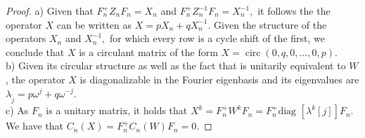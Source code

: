 \documentclass[10pt,a4paper]{amsart}
\newcommand{\circM}{\operatorname{circ}}
\begin{document}
\begin{proof}
    a) Given that $F_n^+Z_nF_n=X_n$ and $F_n^+Z_n^{-1}F_n=X_n^{-1},$ it follows the the operator $X $ can be written as $X=pX_n+qX_n^{-1}$. Given the structure of the operators $X_n$ and $X_n^{-1},$ for which every row is a cycle shift of the first, we conclude that $X$ is a circulant matrix of the 
   form  $X=\circM(0,q,0,\ldots, 0,p)$.
\\b) Given its circular structure as well as the fact that is unitarily equivalent to $W$, the operator $X$ is diagonalizable in the Fourier eigenbasis and its eigenvalues are $\lambda_{\tilde{j}}=p\omega^{j}+q\omega^{-j}.$
\\c) As $F_n$ is a unitary matrix, it holds that $X^k=F_n^+W^kF_n=F_n^+ \text {diag }[\lambda^k[j]]F_n$. \\ We have that 
$C_n(X)=F_n^+C_n(W)F_n=0$.
\end{proof}
\end{document}
